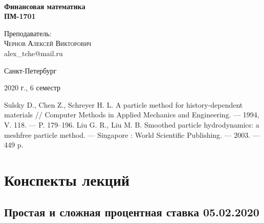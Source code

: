 \documentclass[aps,%
12pt,%
final,%
oneside,
onecolumn,%
musixtex, %
superscriptaddress,%
centertags]{article} %
\begin{document}
\begin{titlepage} 
\begin{center}
 
\textbf{}\\[10.0cm]
\textbf{\LARGE Финансовая математика}\\[0.5cm]
\textbf{\Large ПМ-1701} \\[0.2cm]

\begin{center} \large
{Преподаватель:} \\[0.5cm]
\textsc {Чернов Алексей Викторович}\\
{alex\_tche@mail.ru}\\
\end{center}
\vfill 

{\large {Санкт-Петербург}} \par
{\large {2020 г., 6 семестр}}
\end{center} 
\end{titlepage}

\begin{thebibliography}{3}
	Sulsky D., Chen Z., Schreyer H. L.  A particle method for history-dependent materials // Computer Methods in Applied Mechanics and Engineering. --- 1994, V. 118. --- P. 179--196.
	Liu G. R., Liu M. B. Smoothed particle hydrodynamics: a meshfree particle method. --- Singapore : World Scientific Publishing. --- 2003. --- 449 p.
\end{thebibliography}
\tableofcontents
\newpage
\section{Конспекты лекций}
\subsection{ Простая и сложная процентная ставка 05.02.2020} 
\end{document}
